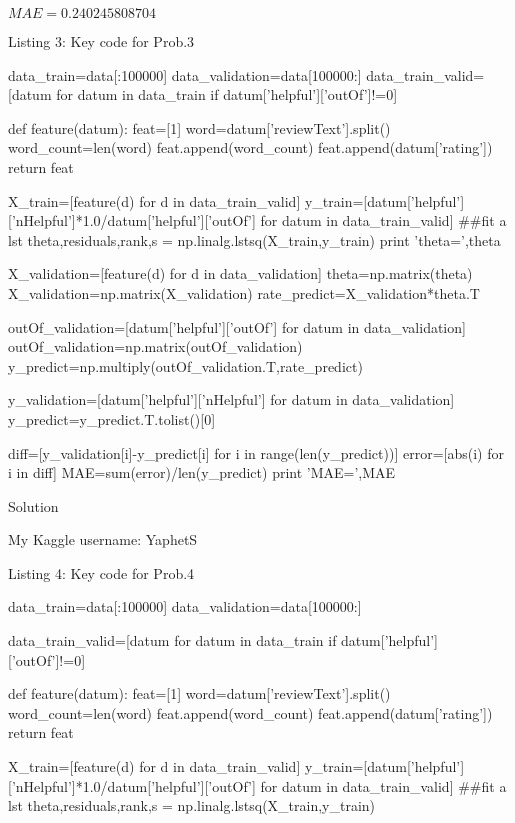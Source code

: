 \documentclass{assignment}
\begin{document}
\begin{problemlist}
\begin{center}
$MAE=0.240245808704$
\end{center}

\begin{center} 
Listing 3: Key code for Prob.3
\end{center}
\begin{python}
data_train=data[:100000]
data_validation=data[100000:]
data_train_valid=[datum for datum in data_train if datum['helpful']['outOf']!=0]

def feature(datum):
    feat=[1]
    word=datum['reviewText'].split()
    word_count=len(word)
    feat.append(word_count)
    feat.append(datum['rating'])
    return feat

X_train=[feature(d) for d in data_train_valid]
y_train=[datum['helpful']['nHelpful']*1.0/datum['helpful']['outOf'] for datum in data_train_valid]
##fit a lst
theta,residuals,rank,s = np.linalg.lstsq(X_train,y_train)
print 'theta=',theta

X_validation=[feature(d) for d in data_validation]
theta=np.matrix(theta)
X_validation=np.matrix(X_validation)
rate_predict=X_validation*theta.T

outOf_validation=[datum['helpful']['outOf'] for datum in data_validation]
outOf_validation=np.matrix(outOf_validation)
y_predict=np.multiply(outOf_validation.T,rate_predict)

y_validation=[datum['helpful']['nHelpful'] for datum in data_validation]
y_predict=y_predict.T.tolist()[0]

diff=[y_validation[i]-y_predict[i] for i in range(len(y_predict))]
error=[abs(i) for i in diff]
MAE=sum(error)/len(y_predict)
print 'MAE=',MAE
\end{python}

\pbitem Solution

My Kaggle username: YaphetS

\begin{center} 
Listing 4: Key code for Prob.4
\end{center}
\begin{python}
data_train=data[:100000]
data_validation=data[100000:]

data_train_valid=[datum for datum in data_train if datum['helpful']['outOf']!=0]

def feature(datum):
    feat=[1]
    word=datum['reviewText'].split()
    word_count=len(word)
    feat.append(word_count)
    feat.append(datum['rating'])
    return feat

X_train=[feature(d) for d in data_train_valid]
y_train=[datum['helpful']['nHelpful']*1.0/datum['helpful']['outOf'] for datum in data_train_valid]
##fit a lst
theta,residuals,rank,s = np.linalg.lstsq(X_train,y_train)


\end{python}
\end{problemlist}
\end{document}
